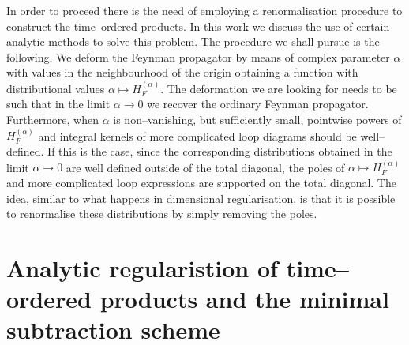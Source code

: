 \documentclass[10pt]{book}
\theoremstyle{break}
\begin{document}
In order to proceed there is the need of employing a renormalisation procedure to construct the time--ordered products.
In this work we discuss the use of certain analytic methods to solve this problem.
The procedure we shall pursue is the following. 
We deform the Feynman propagator by means of complex parameter $\alpha$ with values in the neighbourhood of the origin obtaining a function with distributional values $\alpha \mapsto H_F^{(\alpha)}$. The deformation we are looking for needs to be such that in the limit $\alpha \to 0$ we recover the ordinary Feynman propagator. Furthermore, when $\alpha$ is non--vanishing, but sufficiently small, pointwise powers of $H^{(\alpha)}_F$ and integral kernels of more complicated loop diagrams should be well--defined. If this is the case, since the corresponding distributions obtained in the limit $\alpha\to0$ are well defined outside of the total diagonal, the poles of $\alpha \mapsto H_F^{(\alpha)}$ and more complicated loop expressions are supported on the total diagonal. 
The idea, similar to what happens in dimensional regularisation, is that it is possible to renormalise these distributions by simply removing the poles. 


\section{Analytic regularistion of time--ordered products and the minimal subtraction scheme}
\end{document}
